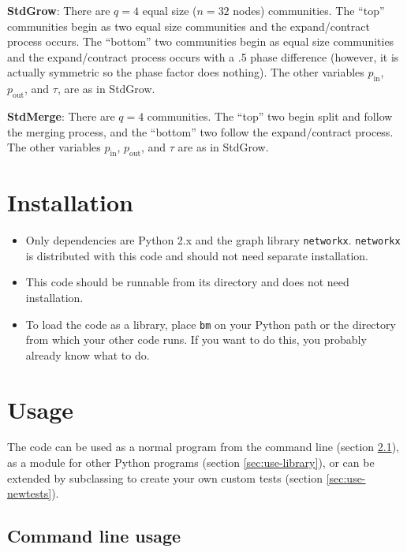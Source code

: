 \documentclass{article}
\def\pin{p_\mathrm{in}}
\def\pout{p_\mathrm{out}}
\begin{document}
\textbf{StdGrow}: There are $q=4$ equal size ($n=32$ nodes)
communities.  The ``top'' communities begin as two equal size
communities and the expand/contract process occurs.  The ``bottom''
two communities begin as equal size communities and the
expand/contract process occurs with a .5 phase difference (however,
it is actually symmetric so the phase factor does nothing).  The other
variables $\pin$, $\pout$, and $\tau$, are as in StdGrow.

\textbf{StdMerge}: There are $q=4$ communities.  The ``top'' two begin
split and follow the merging process, and the ``bottom'' two follow
the expand/contract process.  The other variables $\pin$, $\pout$, and
$\tau$ are as in StdGrow.





\section{Installation}


\begin{itemize}
\item Only dependencies are Python 2.x and the graph library
  \texttt{networkx}.  \texttt{networkx} is distributed with this code
  and should not need separate installation.
\item This code should be runnable from its directory and does not
  need installation.
\item To load the code as a library, place \texttt{bm} on your Python
  path or the directory from which your other code runs.  If you want
  to do this, you probably already know what to do.
\end{itemize}





\section{Usage}

The code can be used as a normal program from the command line
(section \ref{sec:use-cli}), as a module for other Python programs
(section \ref{sec:use-library}), or can be extended by subclassing to
create your own custom tests (section \ref{sec:use-newtests}).




\subsection{Command line usage}
\label{sec:use-cli}
\end{document}
